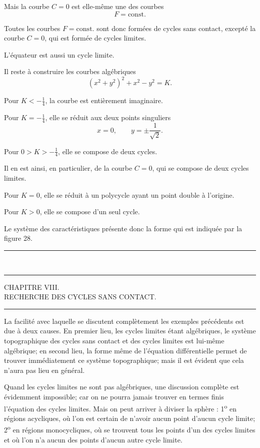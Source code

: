 \documentclass[11pt]{article}
\newcommand{\ornament}{\begin{center}\rule{2.5em}{0.4pt}\,\raisebox{0.1ex}{\tiny$\bullet\bullet\bullet$}\,\rule{2.5em}{0.4pt}\end{center}}
\newcommand{\shortline}{\begin{center}\rule{3.5em}{0.4pt}\end{center}}
\begin{document}
Mais la courbe $C=0$ est elle-même une des courbes
\[
F=\mathrm{const.}
\]

Toutes les courbes $F=\mathrm{const.}$ sont donc formées de cycles sans contact, excepté la courbe $C=0$, qui est formée de cycles limites.

L'équateur est aussi un cycle limite.

Il reste à construire les courbes algébriques
\[
(x^2+y^2)^2+x^2-y^2=K.
\]

Pour $K<-\frac14$, la courbe est entièrement imaginaire.

Pour $K=-\frac14$, elle se réduit aux deux points singuliers
\[
x=0,\qquad y=\pm\frac1{\sqrt2}.
\]

Pour $0>K>-\frac14$, elle se compose de deux cycles.

Il en est ainsi, en particulier, de la courbe $C=0$, qui se compose de deux cycles limites.

Pour $K=0$, elle se réduit à un polycycle ayant un point double à l'origine.

Pour $K>0$, elle se compose d'un seul cycle.

Le système des caractéristiques présente donc la forme qui est indiquée par la figure 28.

\ornament

\begin{center}
{\Large CHAPITRE VIII.}\\[0.4em]
{\small RECHERCHE DES CYCLES SANS CONTACT.}
\end{center}
\shortline

La facilité avec laquelle se discutent complètement les exemples précédents est due à deux causes. En premier lieu, les cycles limites étant algébriques, le système topographique des cycles sans contact et des cycles limites est lui-même algébrique; en second lieu, la forme même de l’équation différentielle permet de trouver immédiatement ce système topographique; mais il est évident que cela n’aura pas lieu en général.

Quand les cycles limites ne sont pas algébriques, une discussion complète est évidemment impossible; car on ne pourra jamais trouver en termes finis l’équation des cycles limites. Mais on peut arriver à diviser la sphère : 1\textsuperscript{o} en régions acycliques, où l’on est certain de n’avoir aucun point d’aucun cycle limite; 2\textsuperscript{o} en régions monocycliques, où se trouvent tous les points d’un des cycles limites et où l’on n’a aucun des points d’aucun autre cycle limite.
\end{document}
